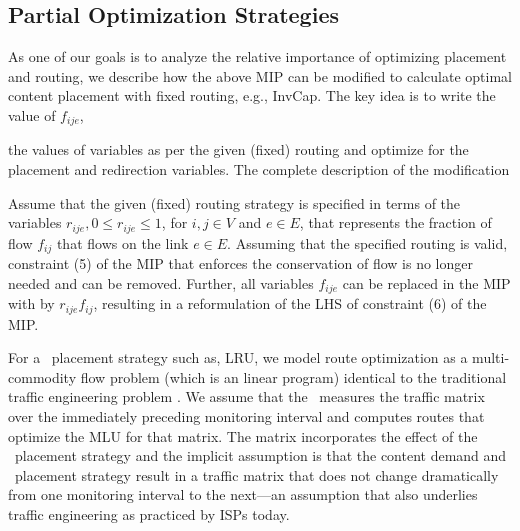 






%

\eat
{
\subsection{Partial Optimization Strategies}
\label{sec:mipinvcap}
As one of our goals is to analyze the relative importance of optimizing placement and routing, we describe how the above MIP can be modified to calculate optimal content placement with fixed routing, e.g., InvCap. The key idea is to write the value of $f_{ije}$, 

 the values of variables  as per the given (fixed) routing and optimize for the placement and redirection variables. 
  The complete description of the modification 

Assume that the given (fixed) routing strategy is specified in terms of the variables $ r_{ije}, 0 \leq r_{ije} \leq 1$, for $i,j \in V$ and $e \in E$, that represents the fraction of flow $f_{ij}$ that flows on the link $e \in E$. Assuming that the specified routing is valid, constraint (5) of the MIP that enforces the conservation of flow is no longer needed and can be removed. Further, all variables $f_{ije}$ can be replaced in the MIP with by $r_{ije} f_{ij}$, resulting in a reformulation of the LHS of constraint (6) of the MIP.

For a \unplanned\ placement strategy such as, LRU, we model route optimization as a multi-commodity flow problem (which is an linear program) identical to  the traditional traffic engineering problem \cite{fortz2000internet}. We assume that the \ncp\ measures the traffic matrix over the immediately preceding monitoring interval and computes routes that optimize the MLU for that matrix. The matrix incorporates the effect of the \unplanned\ placement strategy and the implicit assumption is that the content demand and \unplanned\ placement strategy result in a traffic matrix that does not change dramatically from one monitoring interval to the next---an assumption that also underlies traffic engineering as practiced by ISPs today. 
}




